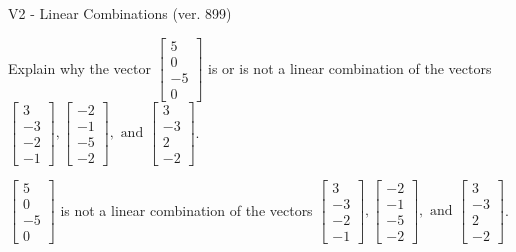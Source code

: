 \begin{exercise}
  \begin{exerciseTitle}V2 - Linear Combinations (ver. 899)\end{exerciseTitle}
  \begin{exerciseStatement}
    Explain why the vector \(\left[\begin{array}{c}
5 \\
0 \\
-5 \\
0
\end{array}\right]\)  is or is not a linear 
	combination of the vectors \(\left[\begin{array}{c}
3 \\
-3 \\
-2 \\
-1
\end{array}\right] , \left[\begin{array}{c}
-2 \\
-1 \\
-5 \\
-2
\end{array}\right] , \text{ and } \left[\begin{array}{c}
3 \\
-3 \\
2 \\
-2
\end{array}\right]\).
	


  \end{exerciseStatement}
  \begin{exerciseAnswer}
   \(\left[\begin{array}{c}
5 \\
0 \\
-5 \\
0
\end{array}\right]\) 
  	 is not  
	a linear combination of the vectors \(\left[\begin{array}{c}
3 \\
-3 \\
-2 \\
-1
\end{array}\right] , \left[\begin{array}{c}
-2 \\
-1 \\
-5 \\
-2
\end{array}\right] , \text{ and } \left[\begin{array}{c}
3 \\
-3 \\
2 \\
-2
\end{array}\right]\).

	
  


  \end{exerciseAnswer}
\end{exercise}
